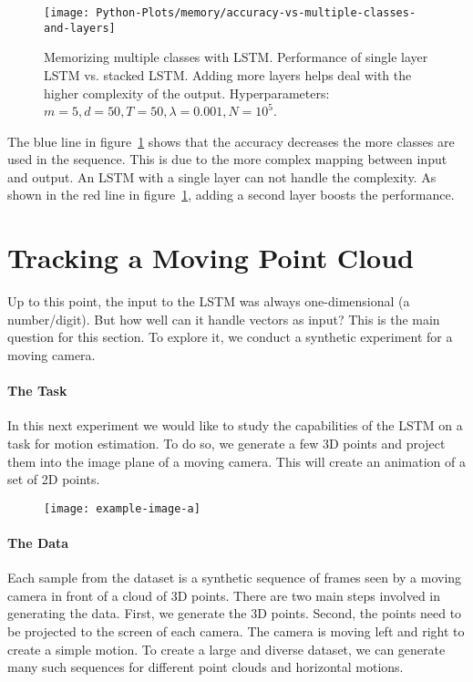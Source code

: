 		\begin{figure}[tb]
			\centering
			\texttt{[image: Python-Plots/memory/accuracy-vs-multiple-classes-and-layers]}
			\caption[Memorizing the past with the LSTM: Multiple classes]
					{Memorizing multiple classes with LSTM.
				 Performance of single layer LSTM vs. stacked LSTM.
				 Adding more layers helps deal with the higher complexity of the output.
				 Hyperparameters: $m = 5, d = 50, T = 50, \lambda = 0.001, N = 10^5$.
				 }
			\label{fig:accuracy-vs-multiple-classes-and-layers}
		\end{figure}
		The blue line in figure~\ref{fig:accuracy-vs-multiple-classes-and-layers} shows that the accuracy decreases the more classes are used in the sequence.
		This is due to the more complex mapping between input and output. 
		An LSTM with a single layer can not handle the complexity.
		As shown in the red line in figure~\ref{fig:accuracy-vs-multiple-classes-and-layers}, adding a second layer boosts the performance.
		
		
	\section{Tracking a Moving Point Cloud}
		
		Up to this point, the input to the LSTM was always one-dimensional (a number/digit).
		But how well can it handle vectors as input?
		This is the main question for this section.
		To explore it, we conduct a synthetic experiment for a moving camera.
		
		\paragraph{The Task}
		In this next experiment we would like to study the capabilities of the LSTM on a task for motion estimation.
		To do so, we generate a few 3D points and project them into the image plane of a moving camera.
		This will create an animation of a set of 2D points.
		
		\begin{figure}[tb]
			\centering
			\texttt{[image: example-image-a]}
			\caption[]
					{}
			\label{}
		\end{figure}
	
		\paragraph{The Data}
		Each sample from the dataset is a synthetic sequence of frames seen by a moving camera in front of a cloud of 3D points.
		There are two main steps involved in generating the data.
		First, we generate the 3D points.
		Second, the points need to be projected to the screen of each camera.
		The camera is moving left and right to create a simple motion.
		To create a large and diverse dataset, we can generate many such sequences for different point clouds and horizontal motions.
		

